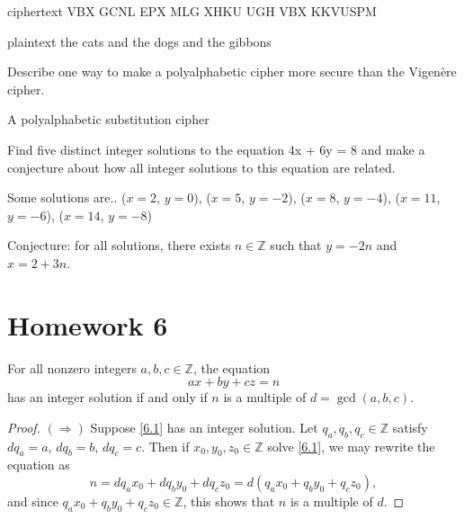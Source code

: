 \begin{problem}
ciphertext VBX GCNL EPX MLG XHKU UGH VBX KKVUSPM


plaintext  the cats and the dogs and the gibbons


\begin{problem}
Describe one way to make a polyalphabetic cipher more secure than the Vigen\`{e}re cipher.
\end{problem}
\solution A polyalphabetic substitution cipher 


\begin{problem}
Find five distinct integer solutions to the equation 4x + 6y = 8 and make a
conjecture about how all integer solutions to this equation are related.
\end{problem}

\solution
Some solutions are..
($x=2$, $y=0$), ($x=5$, $y=-2$), ($x=8$, $y=-4$), ($x=11$, $y=-6$), ($x=14$, $y=-8$)

Conjecture: for all solutions, there exists $n \in \mathbb{Z}$ such that
$y=-2n$ and $x=2+3n$.

\section{Homework 6}

\begin{problem}[1] For all nonzero integers $a,b,c \in \mathbb Z$, the equation 
\begin{equation} \label{6.1}
ax + by + cz = n
\end{equation}
has an integer solution if and only if $n$ is a multiple of $d = \gcd(a,b,c)$.
\end{problem}
\begin{proof} $(\Longrightarrow)$ Suppose \ref{6.1} has an integer solution. Let $q_a, q_b, q_c \in \mathbb Z$ satisfy $dq_a = a$, $dq_b = b$, $dq_c = c$. Then if $x_0,y_0,z_0 \in \mathbb Z$ solve \ref{6.1}, we may rewrite the equation as
\[
n = dq_ax_0 + dq_by_0 + dq_cz_0 = d(q_ax_0 + q_by_0 + q_cz_0),
\]
and since $q_ax_0 + q_by_0 + q_cz_0 \in \mathbb Z$, this shows that $n$ is a multiple of $d$. 


\end{proof}
\end{problem}
